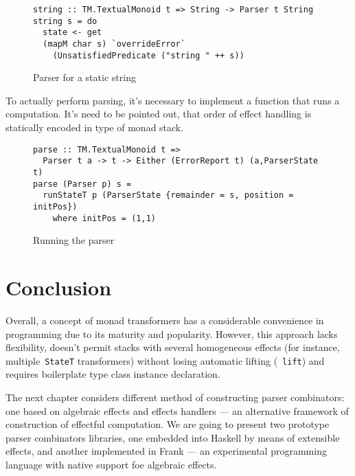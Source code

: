       \begin{figure}[h]
      \begin{lstlisting}
string :: TM.TextualMonoid t => String -> Parser t String
string s = do
  state <- get
  (mapM char s) `overrideError`
    (UnsatisfiedPredicate ("string " ++ s))
      \end{lstlisting}
      \caption{Parser for a static string}
      \label{listing:mtlParserString}
      \end{figure}

      To actually perform parsing, it's necessary to implement a function that
      runs a computation. It's need to be
      pointed out, that order of effect handling is statically encoded in type of
      monad stack.

      \begin{figure}[h]
      \begin{lstlisting}
parse :: TM.TextualMonoid t =>
  Parser t a -> t -> Either (ErrorReport t) (a,ParserState t)
parse (Parser p) s =
  runStateT p (ParserState {remainder = s, position = initPos})
    where initPos = (1,1)
      \end{lstlisting}
      \caption{Running the parser}
      \label{listing:mtlParserParse}
      \end{figure}

    \section{Conclusion}

    Overall, a concept of monad transformers has a considerable convenience in programming due to
    its maturity and popularity. However, this
    approach lacks flexibility, doesn't permit stacks with several homogeneous
    effects (for instance, multiple~\texttt{StateT} transformers) without
    losing automatic lifting (~\texttt{lift}) and requires boilerplate
    type class instance declaration.

    The next chapter considers different method of constructing parser combinators: one
    based on algebraic effects and effects handlers --- an alternative framework of construction of effectful computation. We are going to present two prototype
    parser combinators libraries, one embedded into Haskell by means of extensible
    effects, and another implemented in Frank --- an experimental programming language
    with native support foe algebraic effects.